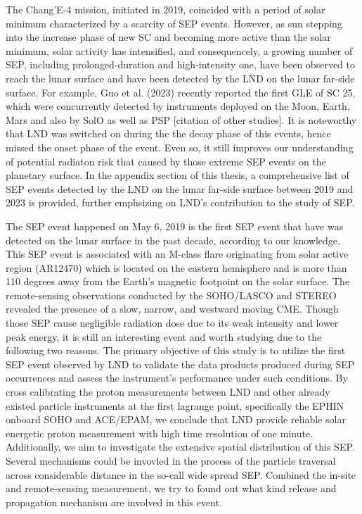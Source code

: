 
The Chang'E-4 mission, initiated in 2019, coincided with a period of solar minimum characterized by a scarcity of \ac{SEP} events. However, as sun stepping into the increase phase of new \ac{SC} and becoming more active than the solar minimum, solar activity has intensified, and consequencely, a growing number of \acs{SEP}, including prolonged-duration and high-intensity one, have been observed to reach the lunar surface and have been detected by the \ac{LND} on the lunar far-side surface. For example, Guo et al. (2023) recently reported the first \ac{GLE} of \ac{SC} 25, which were concurrently detected by instruments deployed on the Moon, Earth, Mars and also by \ac{SolO} as well as \ac{PSP} [citation of other studies]. It is noteworthy that \ac{LND} was switched on during the the decay phase of this events, hence missed the onset phase of the event. Even so, it still improves our understanding of potential radiaton risk that caused by those extreme \ac{SEP} events on the planetary surface.
In the appendix section of this thesis, a comprehensive list of \ac{SEP} events detected by the \ac{LND} on the lunar far-side surface between 2019 and 2023 is provided, further emphsizing on \ac{LND}'s contribution to the study of \acs{SEP}.


The \ac{SEP} event happened on May 6, 2019 is the first \ac{SEP} event that have was detected on the lunar surface in the past decade, according to our knowledge. 
This \ac{SEP} event is associated with an M-class flare originating from solar active region (AR12470) which is located on the eastern hemisphere and is more than 110 degrees away from the Earth's magnetic footpoint on the solar surface. The remote-sensing observations conducted by the \ac{SOHO}/\ac{LASCO} and \ac{STEREO} revealed the presence of a slow, narrow, and westward moving \ac{CME}. 
Though those \acs{SEP} cause negligible radiation dose due to its weak intensity and lower peak energy, it is still an interesting event and worth studying due to the following two reasons.
The primary objective of this study is to utilize the first \ac{SEP} event observed by \ac{LND} to validate the data products produced during \ac{SEP} occurrences and assess the instrument's performance under such conditions. By cross calibrating the proton measurements between \ac{LND} and other already existed particle instruments at the first lagrange point, specifically the \ac{EPHIN} onboard \ac{SOHO} and \ac{ACE}/\ac{EPAM}, we conclude that \ac{LND} provide reliable solar energetic proton measurement with high time resolution of one minute.
Additionally, we aim to investigate the extensive spatial distribution of this \ac{SEP}. Several mechanisms could be invovled in the process of the particle traversal across considerable distance in the so-call wide spread \acs{SEP}. Combined the in-site and remote-sensing measurement, we try to found out what kind release and propagation mechanism are involved in this event.


